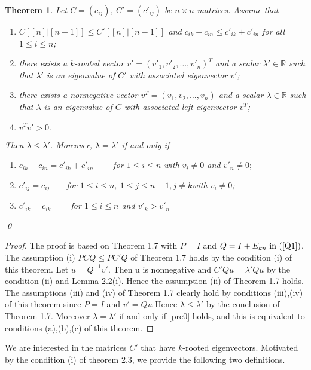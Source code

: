 \documentclass[12pt]{report}
\theoremstyle{plain}
\newtheorem{thm}{Theorem}[chapter]
\theoremstyle{definition}
\begin{document}
\begin{thm} \label{thm_main}
    Let $C=(c_{ij})$, $C'=(c'_{ij})$ be  $n\times n$ matrices.
Assume that
\begin{enumerate}
\item[(i)]   $C[[n]|[n-1]]\leq C'[[n]|[n-1]]$ and $c_{ik}+c_{in}\leq c'_{ik}+c'_{in}$ for all $1\leq i\leq n$;
\item[(ii)] there exists a $k$-rooted vector $v'=(v'_1, v'_2, \ldots, v'_n)^T$ and a scalar $\lambda'\in \mathbb{R}$
such that $\lambda'$ is an eigenvalue of $C'$ with associated eigenvector $v'$;
\item[(iii)] there exists a nonnegative vector $v^T=(v_1, v_2, \ldots, v_n)$ and a scalar $\lambda\in \mathbb{R}$ such that $\lambda$ is an eigenvalue of $C$ with associated left eigenvector $v^T$;
\item[(iv)] $v^Tv'>0.$
\end{enumerate}
 Then $\lambda\leq \lambda'$.
Moreover, $\lambda=\lambda'$
if and only if
\begin{enumerate}
\item[(a)]    $c_{ik}+c_{in}=c'_{ik}+c'_{in} \qquad$  for $1\leq i\leq n$ with $v_i\not=0$ and $v'_n\not=0;$
\item[(b)]  $c'_{ij}=c_{ij}\qquad $for $1\leq i\leq n,~1\leq j\leq n-1, j \neq k $with $v_i\ne 0 $;
\item[(c)]   $c'_{ik}=c_{ik} \qquad $  for $1\leq i \leq n$ and $ v'_{k}>v'_n$ 
\end{enumerate} \qed
\end{thm}

\begin{proof}
The proof is based on Theorem 1.7 with $P = I$ and $Q = I + E_{kn} \text{ in } (\ref{Q1} )$. 
The assumption (i) $PCQ\leq PC'Q$ of Theorem 1.7 holds by the condition (i) of this theorem. 
Let $u = Q^{-1}v'$. Then u is nonnegative and $C'Qu = \lambda' Qu$ by the condition (ii) and
 Lemma 2.2(i). Hence the assumption (ii) of Theorem 1.7 holds. The assumptions (iii) and (iv)
  of Theorem 1.7 clearly hold by conditions (iii),(iv) of this theorem since $P = I$ and
   $v'= Qu$  Hence $\lambda \leq \lambda' $ by the conclusion of Theorem 1.7. Moreover
    $\lambda = \lambda'$ if and only if \ref{pre0} holds, and this is equivalent to
     conditions (a),(b),(c) of this theorem. 
\end{proof}

We are interested in the matrices $C'$ that have $k$-rooted eigenvectors.
Motivated by the condition (i) of theorem 2.3, we provide the following two definitions. 
\end{document}
